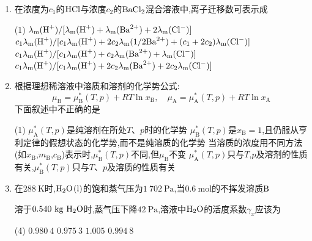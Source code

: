 \begin{enumerate}[label=\arabic*., itemsep=1.5ex]
    初始浓度为$0.024\ \mathrm{mol\cdot dm^{-3}}$时,半衰期为$600\ \mathrm{s}$,此反应为
    \begin{tasks}(4)
        \task $0$级反应
        \task $1.5$级反应
        \task $2$级反应
        \task $1$级反应
    \end{tasks}
    \item 在浓度为$c_1$的$\ce{HCl}$与浓度$c_2$的$\ce{BaCl2}$混合溶液中,离子迁移数可表示成
    \begin{tasks}(1)
        \task $\lambda_\mathrm{m}(\ce{H^+})/[\lambda_\mathrm{m}(\ce{H^+}) + \lambda_\mathrm{m}(\ce{Ba^{2+}}) + 2\lambda_\mathrm{m}(\ce{Cl^-})]$
        \task $c_1\lambda_\mathrm{m}(\ce{H^+})/[c_1\lambda_\mathrm{m}(\ce{H^+}) + 2c_2\lambda_\mathrm{m}(1/2\ce{Ba^{2+}}) + (c_1+2c_2)\lambda_\mathrm{m}(\ce{Cl^-})]$
        \task $c_1\lambda_\mathrm{m}(\ce{H^+})/[c_1\lambda_\mathrm{m}(\ce{H^+}) + c_2\lambda_\mathrm{m}(\ce{Ba^{2+}}) + \lambda_\mathrm{m}(\ce{Cl^-})]$
        \task $c_1\lambda_\mathrm{m}(\ce{H^+})/[c_1\lambda_\mathrm{m}(\ce{H^+}) + 2c_2\lambda_\mathrm{m}(\ce{Ba^{2+}}) + 2c_2\lambda_\mathrm{m}(\ce{Cl^-})]$
    \end{tasks}
    \item 根据理想稀溶液中溶质和溶剂的化学势公式:
    \[
    \mu_\mathrm{B} = \mu_\mathrm{B}^*(T,p) + RT\ln x_\mathrm{B},\quad \mu_\mathrm{A} = \mu_\mathrm{A}^*(T,p) + RT\ln x_\mathrm{A}
    \]
    下面叙述中不正确的是
    \begin{tasks}(1)
        \task $\mu_\mathrm{A}^*(T,p)$是纯溶剂在所处$T$、$p$时的化学势
        \task $\mu_\mathrm{B}^*(T,p)$是$x_\mathrm{B}=1$,且仍服从亨利定律的假想状态的化学势,而不是纯溶质的化学势
        \task 当溶质的浓度用不同方法(如$x_\mathrm{B}$,$m_\mathrm{B}$,$c_\mathrm{B}$)表示时,$\mu_\mathrm{B}^*(T,p)$不同,但$\mu_\mathrm{B}$不变
        \task $\mu_\mathrm{A}^*(T,p)$只与$T$,$p$及溶剂的性质有关,$\mu_\mathrm{B}^*(T,p)$只与$T$、$p$及溶质的性质有关
    \end{tasks}
    \item 在$288\ \mathrm{K}$时,$\ce{H2O(l)}$的饱和蒸气压为$1\ 702\ \mathrm{Pa}$,当$0.6\ \mathrm{mol}$的不挥发溶质$\ce{B}$
    
    溶于$0.540\ \mathrm{kg}\ \ce{H2O}$时,蒸气压下降$42\ \mathrm{Pa}$,溶液中$\ce{H2O}$的活度系数$\gamma_x$应该为
    \begin{tasks}(4)
        \task $0.980\ 4$
        \task $0.975\ 3$
        \task $1.005$
        \task $0.994\ 8$
    \end{tasks}
\end{enumerate}

